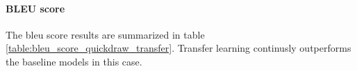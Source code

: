 
      \paragraph{BLEU score}
        The bleu score results are summarized in table \ref{table:bleu_score_quickdraw_transfer}. Transfer learning continusly outperforms the baseline models in this case.

